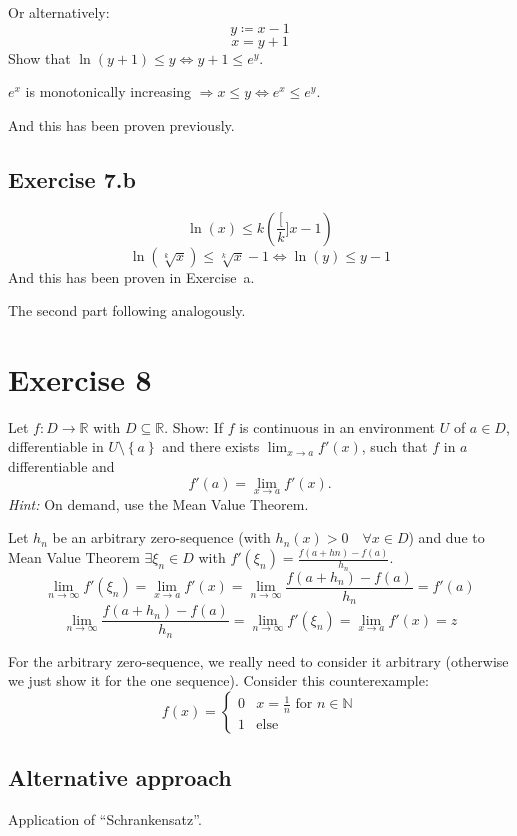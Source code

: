 \documentclass[a4paper]{article}
\theoremstyle{definition}
\newcommand\set[1]{\left\{#1\right\}}
\begin{document}
Or alternatively:
\[ y \coloneqq x - 1 \]
\[ x = y + 1 \]
Show that $\ln(y + 1) \leq y \Leftrightarrow y + 1 \leq e^y$.

$e^x$ is monotonically increasing $\Rightarrow x \leq y \Leftrightarrow e^x \leq e^y$.

And this has been proven previously.

\subsection{Exercise 7.b}
\[ \ln(x) \leq k \left(\frac[k]{x} - 1\right) \]
\[ \ln(\sqrt[k]{x}) \leq \sqrt[k]{x} - 1 \Leftrightarrow \ln(y) \leq y - 1 \]
And this has been proven in Exercise~a.

The second part following analogously.

\section{Exercise 8}
\begin{ex}
  Let $f: D \to \mathbb R$ with $D \subseteq \mathbb R$. Show: If $f$ is continuous in an environment
  $U$ of $a \in D$, differentiable in $U \setminus \set{a}$ and there exists $\lim_{x\to a} f'(x)$,
  such that $f$ in $a$ differentiable and
  \[ f'(a) = \lim_{x\to a} f'(x). \]
  \emph{Hint:} On demand, use the Mean Value Theorem.
\end{ex}

Let $h_n$ be an arbitrary zero-sequence (with $h_n(x) > 0 \quad \forall x \in D$) and due to Mean Value Theorem $\exists \xi_n \in D$ with $f'(\xi_n) = \frac{f(a + hn) - f(a)}{h_n}$.
\[ \lim_{n\to\infty} f'(\xi_n) = \lim_{x\to a} f'(x) = \lim_{n\to\infty} \frac{f(a + h_n) - f(a)}{h_n} = f'(a) \]
\[ \lim_{n\to\infty} \frac{f(a + h_n) - f(a)}{h_n} = \lim_{n\to\infty} f'(\xi_n) = \lim_{x\to a} f'(x) = z \]

For the arbitrary zero-sequence, we really need to consider it arbitrary (otherwise we just show it for the one sequence). Consider this counterexample:
\[
  f(x) = \begin{cases}
    0 & x = \frac1n \text{ for } n \in \mathbb N \\
    1 & \text{else}
  \end{cases}
\]

\subsection{Alternative approach}
Application of \enquote{Schrankensatz}.
\end{document}
